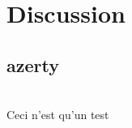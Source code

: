 \documentclass[../main.tex]{subfiles}
\begin{document}
\chapter{Discussion}

\section{azerty}

\lipsum[1-2]\\

Ceci n'est qu'un test\cite{DUMMY:001}

\ifSubfilesClassLoaded{%
}{}
\end{document}
